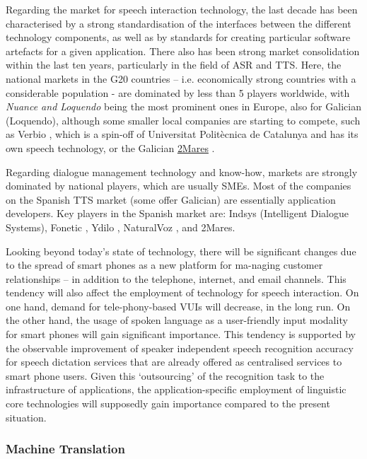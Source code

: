 \begin{multicols}{2}
\begin{itemize}
\begin{multicols}{2}
Regarding the market for speech interaction technology, the last decade has been characterised by a strong standardisation of the interfaces between the different technology components, as well as by standards for creating particular software artefacts for a given application. There also has been strong market consolidation within the last ten years, particularly in the field of ASR and TTS. Here, the national markets in the G20 countries – i.e. economically strong countries with a considerable population - are dominated by less than 5 players worldwide, with \textit{Nuance and Loquendo} being the most prominent ones in Europe, also for Galician (Loquendo), although some smaller local companies are starting to compete, such as Verbio \cite{GAL-Nota25} , which is a spin-off of Universitat Politècnica de Catalunya and has its own speech technology, or the Galician \uline{2Mares} \cite{GAL-Nota26}. 

Regarding dialogue management technology and know-how, markets are strongly dominated by national players, which are usually SMEs.
Most of the companies on the Spanish TTS market (some offer Galician) are essentially application developers. Key players in the Spanish market are: Indsys \cite{GAL-Nota27} (Intelligent Dialogue Systems), Fonetic \cite{GAL-Nota28}, Ydilo \cite{GAL-Nota29}, NaturalVoz \cite{GAL-Nota30}, and 2Mares.

Looking beyond today’s state of technology, there will be significant changes due to the spread of smart phones as a new platform for ma-naging customer relationships – in addition to the telephone, internet, and email channels. This tendency will also affect the employment of technology for speech interaction. On one hand, demand for tele-phony-based VUIs will decrease, in the long run. On the other hand, the usage of spoken language as a user-friendly input modality for smart phones will gain significant importance. This tendency is supported by the observable improvement of speaker independent speech recognition accuracy for speech dictation services that are already offered as centralised services to smart phone users. Given this ‘outsourcing’ of the recognition task to the infrastructure of applications, the application-specific employment of linguistic core technologies will supposedly gain importance compared to the present situation. 

\subsubsection{Machine Translation}


\end{multicols}
\end{itemize}
\end{multicols}
